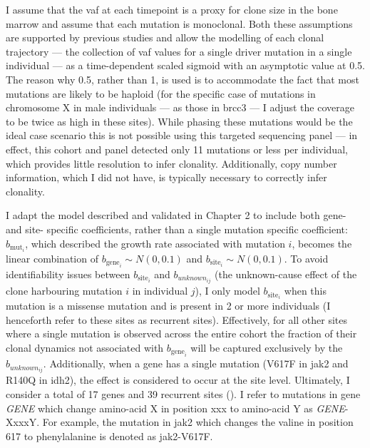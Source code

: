 I assume that the \ac{vaf} at each timepoint is a proxy for clone size in the bone marrow and assume that each mutation is monoclonal. Both these assumptions are supported by previous studies \cite{Miles2020-fz,Lee2020-yp,Hwang2018-tp} and allow the modelling of each clonal trajectory --- the collection of \ac{vaf} values for a single driver mutation in a single individual --- as a time-dependent scaled sigmoid with an asymptotic value at 0.5. The reason why 0.5, rather than 1, is used is to accommodate the fact that most mutations are likely to be haploid (for the specific case of mutations in chromosome X in male individuals --- as those in \ac{brcc3} --- I adjust the coverage to be twice as high in these sites). While phasing these mutations would be the ideal case scenario this is not possible using this targeted sequencing panel --- in effect, this cohort and panel detected only 11 mutations or less per individual, which provides little resolution to infer clonality. Additionally, copy number information, which I did not have, is typically necessary to correctly infer clonality.

I adapt the model described and validated in Chapter 2 to include both gene- and site- specific coefficients, rather than a single mutation specific coefficient: $b_{\mathrm{mut}_i}$, which described the growth rate associated with mutation $i$, becomes the linear combination of $b_{\mathrm{gene}_i} \sim N(0,0.1)$ and $b_{\mathrm{site}_i} \sim N(0,0.1)$. To avoid identifiability issues between $b_{\mathrm{site}_i}$ and $b_{unknown_{ij}}$ (the unknown-cause effect of the clone harbouring mutation $i$ in individual $j$), I only model $b_{\mathrm{site}_i}$ when this mutation is a missense mutation and is present in 2 or more individuals (I henceforth refer to these sites as recurrent sites). Effectively, for all other sites where a single mutation is observed across the entire cohort the fraction of their clonal dynamics not associated with $b_{\mathrm{gene}_i}$ will be captured exclusively by the $b_{unknown_{ij}}$. Additionally, when a gene has a single mutation (V617F in \ac{jak2} and R140Q in \ac{idh2}), the effect is considered to occur at the site level. Ultimately, I consider a total of 17 genes and 39 recurrent sites (). I refer to mutations in gene \textit{GENE} which change amino-acid X in position xxx to amino-acid Y as \textit{GENE}-XxxxY. For example, the mutation in \ac{jak2} which changes the valine in position 617 to phenylalanine is denoted as \ac{jak2}-V617F.

